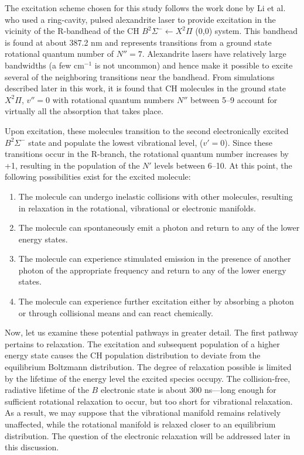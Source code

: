 The excitation scheme chosen for this study follows the work done by Li et al.\cite{2007-li-a} who used a ring-cavity, pulsed alexandrite laser to provide excitation in the vicinity of the R-bandhead of the CH \(B^2\Sigma^- \leftarrow X^2\Pi\) (0,0) system.
This bandhead is found at about 387.2 nm and represents transitions from a ground state rotational quantum number of \(N''=7\).
Alexandrite lasers have relatively large bandwidths (a few cm\(^{-1}\) is not uncommon) and hence make it possible to excite several of the neighboring transitions near the bandhead.
From simulations described later in this work, it is found that CH molecules in the ground state \(X^2\Pi\), \(v''=0\) with rotational quantum numbers \(N''\) between 5--9 account for virtually all the absorption that takes place.

Upon excitation, these molecules transition to the second electronically excited \(B^2\Sigma^-\) state and populate the lowest vibrational level, (\(v'=0\)).
Since these transitions occur in the R-branch, the rotational quantum number increases by +1, resulting in the population of the \(N'\) levels between 6--10.
At this point, the following possibilities exist for the excited molecule:

\begin{enumerate}
  \item The molecule can undergo inelastic collisions with other molecules, resulting in relaxation in the rotational, vibrational or electronic manifolds.
  \item The molecule can spontaneously emit a photon and return to any of the lower energy states.
  \item The molecule can experience stimulated emission in the presence of another photon of the appropriate frequency and return to any of the lower energy states.
  \item The molecule can experience further excitation either by absorbing a photon or through collisional means and can react chemically.
\end{enumerate}

Now, let us examine these potential pathways in greater detail.
The first pathway pertains to relaxation.
The excitation and subsequent population of a higher energy state causes the CH population distribution to deviate from the equilibrium Boltzmann distribution.
The degree of relaxation possible is limited by the lifetime of the energy level the excited species occupy.
The collision-free, radiative lifetime of the \(B\) electronic state is about 300 ns\cite{1996-luque-c}---long enough for sufficient rotational relaxation to occur, but too short for vibrational relaxation.
As a result, we may suppose that the vibrational manifold remains relatively unaffected, while the rotational manifold is relaxed closer to an equilibrium distribution.
The question of the electronic relaxation will be addressed later in this discussion.

